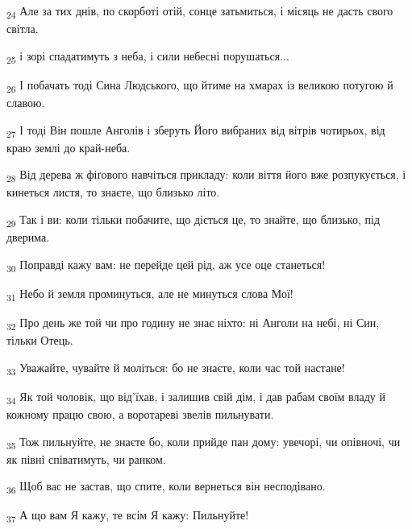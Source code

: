 \begin{tcolorbox}
\textsubscript{24} Але за тих днів, по скорботі отій, сонце затьмиться, і місяць не дасть свого світла.
\end{tcolorbox}
\begin{tcolorbox}
\textsubscript{25} і зорі спадатимуть з неба, і сили небесні порушаться...
\end{tcolorbox}
\begin{tcolorbox}
\textsubscript{26} І побачать тоді Сина Людського, що йтиме на хмарах із великою потугою й славою.
\end{tcolorbox}
\begin{tcolorbox}
\textsubscript{27} І тоді Він пошле Анголів і зберуть Його вибраних від вітрів чотирьох, від краю землі до край-неба.
\end{tcolorbox}
\begin{tcolorbox}
\textsubscript{28} Від дерева ж фіґового навчіться прикладу: коли віття його вже розпукується, і кинеться листя, то знаєте, що близько літо.
\end{tcolorbox}
\begin{tcolorbox}
\textsubscript{29} Так і ви: коли тільки побачите, що діється це, то знайте, що близько, під дверима.
\end{tcolorbox}
\begin{tcolorbox}
\textsubscript{30} Поправді кажу вам: не перейде цей рід, аж усе оце станеться!
\end{tcolorbox}
\begin{tcolorbox}
\textsubscript{31} Небо й земля проминуться, але не минуться слова Мої!
\end{tcolorbox}
\begin{tcolorbox}
\textsubscript{32} Про день же той чи про годину не знає ніхто: ні Анголи на небі, ні Син, тільки Отець.
\end{tcolorbox}
\begin{tcolorbox}
\textsubscript{33} Уважайте, чувайте й моліться: бо не знаєте, коли час той настане!
\end{tcolorbox}
\begin{tcolorbox}
\textsubscript{34} Як той чоловік, що від'їхав, і залишив свій дім, і дав рабам своїм владу й кожному працю свою, а воротареві звелів пильнувати.
\end{tcolorbox}
\begin{tcolorbox}
\textsubscript{35} Тож пильнуйте, не знаєте бо, коли прийде пан дому: увечорі, чи опівночі, чи як півні співатимуть, чи ранком.
\end{tcolorbox}
\begin{tcolorbox}
\textsubscript{36} Щоб вас не застав, що спите, коли вернеться він несподівано.
\end{tcolorbox}
\begin{tcolorbox}
\textsubscript{37} А що вам Я кажу, те всім Я кажу: Пильнуйте!
\end{tcolorbox}
